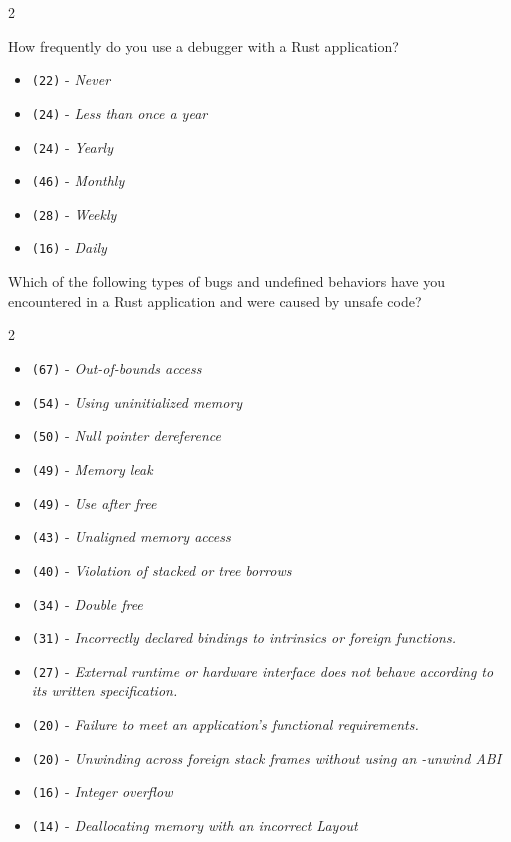 \begin{protocol}
\begin{multicols}{2}
\begin{itemize}
\end{itemize}
\end{multicols}
\item \label{survey:vq4}  How frequently do you use a debugger with a Rust application?
\begin{itemize}
\item \texttt{(22)} - \textit{Never}
\item \texttt{(24)} - \textit{Less than once a year}
\item \texttt{(24)} - \textit{Yearly}
\item \texttt{(46)} - \textit{Monthly}
\item \texttt{(28)} - \textit{Weekly}
\item \texttt{(16)} - \textit{Daily}
\end{itemize}
\item \label{survey:vq5}  Which of the following types of bugs and undefined behaviors have you encountered in a Rust application and were caused by unsafe code?
\begin{multicols}{2}
\begin{itemize}
\item \texttt{(67)} - \textit{Out-of-bounds access}
\item \texttt{(54)} - \textit{Using uninitialized memory}
\item \texttt{(50)} - \textit{Null pointer dereference}
\item \texttt{(49)} - \textit{Memory leak}
\item \texttt{(49)} - \textit{Use after free}
\item \texttt{(43)} - \textit{Unaligned memory access}
\item \texttt{(40)} - \textit{Violation of stacked or tree borrows}
\item \texttt{(34)} - \textit{Double free}
\item \texttt{(31)} - \textit{Incorrectly declared bindings to intrinsics or foreign functions.}
\item \texttt{(27)} - \textit{External runtime or hardware interface does not behave according to its written specification.}
\item \texttt{(20)} - \textit{Failure to meet an application's functional requirements.}
\item \texttt{(20)} - \textit{Unwinding across foreign stack frames without using an -unwind ABI}
\item \texttt{(16)} - \textit{Integer overflow}
\item \texttt{(14)} - \textit{Deallocating memory with an incorrect Layout}

\end{itemize}
\end{multicols}
\end{protocol}
